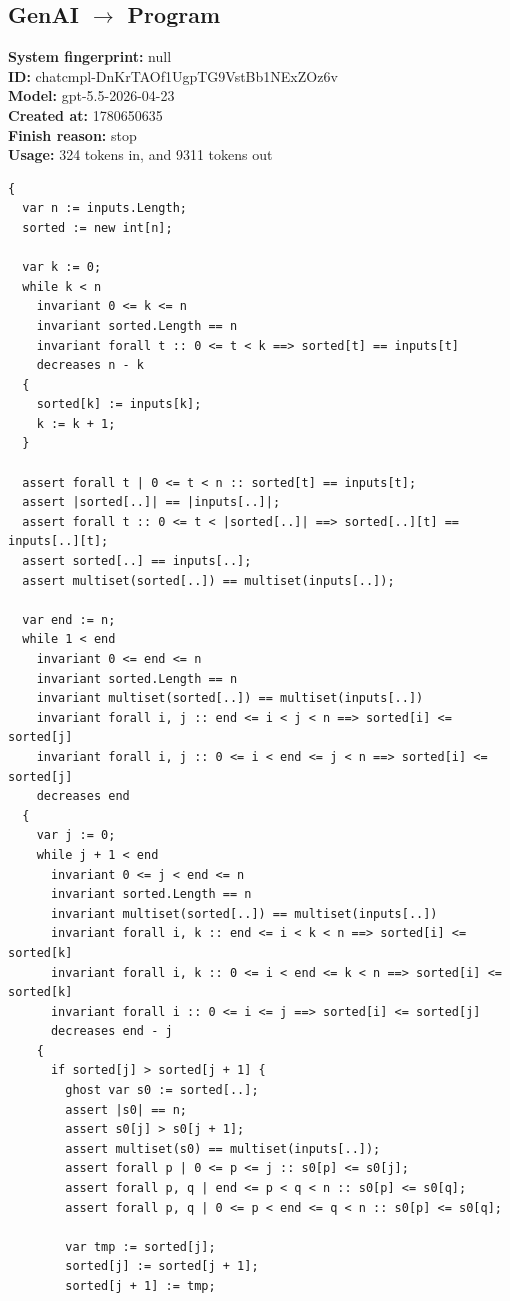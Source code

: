 \documentclass{article}
\begin{document}
\subsection*{GenAI $\rightarrow$ Program}
\textbf{System fingerprint: }null
\\\textbf{ID: }chatcmpl-DnKrTAOf1UgpTG9VstBb1NExZOz6v
\\\textbf{Model: }gpt-5.5-2026-04-23
\\\textbf{Created at: }1780650635
\\\textbf{Finish reason: }stop
\\\textbf{Usage: }324 tokens in, and 9311 tokens out
\begin{lstlisting}
{
  var n := inputs.Length;
  sorted := new int[n];

  var k := 0;
  while k < n
    invariant 0 <= k <= n
    invariant sorted.Length == n
    invariant forall t :: 0 <= t < k ==> sorted[t] == inputs[t]
    decreases n - k
  {
    sorted[k] := inputs[k];
    k := k + 1;
  }

  assert forall t | 0 <= t < n :: sorted[t] == inputs[t];
  assert |sorted[..]| == |inputs[..]|;
  assert forall t :: 0 <= t < |sorted[..]| ==> sorted[..][t] == inputs[..][t];
  assert sorted[..] == inputs[..];
  assert multiset(sorted[..]) == multiset(inputs[..]);

  var end := n;
  while 1 < end
    invariant 0 <= end <= n
    invariant sorted.Length == n
    invariant multiset(sorted[..]) == multiset(inputs[..])
    invariant forall i, j :: end <= i < j < n ==> sorted[i] <= sorted[j]
    invariant forall i, j :: 0 <= i < end <= j < n ==> sorted[i] <= sorted[j]
    decreases end
  {
    var j := 0;
    while j + 1 < end
      invariant 0 <= j < end <= n
      invariant sorted.Length == n
      invariant multiset(sorted[..]) == multiset(inputs[..])
      invariant forall i, k :: end <= i < k < n ==> sorted[i] <= sorted[k]
      invariant forall i, k :: 0 <= i < end <= k < n ==> sorted[i] <= sorted[k]
      invariant forall i :: 0 <= i <= j ==> sorted[i] <= sorted[j]
      decreases end - j
    {
      if sorted[j] > sorted[j + 1] {
        ghost var s0 := sorted[..];
        assert |s0| == n;
        assert s0[j] > s0[j + 1];
        assert multiset(s0) == multiset(inputs[..]);
        assert forall p | 0 <= p <= j :: s0[p] <= s0[j];
        assert forall p, q | end <= p < q < n :: s0[p] <= s0[q];
        assert forall p, q | 0 <= p < end <= q < n :: s0[p] <= s0[q];

        var tmp := sorted[j];
        sorted[j] := sorted[j + 1];
        sorted[j + 1] := tmp;


\end{lstlisting}
\end{document}
